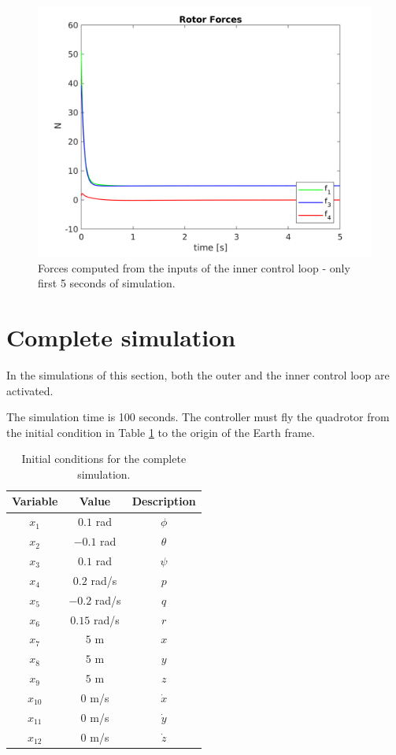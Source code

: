 \documentclass[11pt,a4paper]{scrartcl}
\begin{document}
\begin{figure}
	\centering
	\includegraphics[width=0.7\linewidth]{Images/ForcesInner}
	\caption{Forces computed from the inputs of the inner control loop - only first 5 seconds of simulation.}
	\label{fig:forcesiInner}
\end{figure}

\section*{Complete simulation}

In the simulations of this section, both the outer and the inner control loop are activated. 

The simulation time is 100 seconds. The controller must fly the quadrotor from the initial condition in Table \ref{SimulationInit} to the origin of the Earth frame. 

\begin{table}
	\centering
	\begin{tabular}{c c c}
		\toprule
		Variable & Value & Description \\
		\midrule 
		$x_1$  & $0.1$ rad & $\phi$ \\
		$x_2$  & $-0.1$ rad & $\theta$ \\
		$x_3$  & $0.1$ rad & $\psi$ \\
		$x_4$  & $0.2$ rad/s & $p$ \\
		$x_5$  & $-0.2$ rad/s & $q$ \\
		$x_6$  & $0.15$ rad/s & $r$ \\
		$x_7$  & $5$ m & $x$ \\
		$x_8$  & $5$ m & $y$ \\
		$x_9$  & $5$ m & $z$ \\
		$x_{10}$  & $0$ m/s & $\dot{x}$ \\
		$x_{11}$  & $0$ m/s & $\dot{y}$ \\
		$x_{12}$  & $0$ m/s & $\dot{z}$ \\
		\bottomrule
	\end{tabular}
	\caption{Initial conditions for the complete simulation.}
	\label{SimulationInit}
\end{table}
\end{document}
